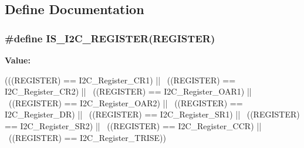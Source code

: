 \subsection{Define Documentation}
\hypertarget{group__I2C__registers_ga37206b258f7930065c308ec7d35f243e}{
\subsubsection[{IS\_\-I2C\_\-REGISTER}]{\setlength{\rightskip}{0pt plus 5cm}\#define IS\_\-I2C\_\-REGISTER(REGISTER)}}
\label{group__I2C__registers_ga37206b258f7930065c308ec7d35f243e}
{\bfseries Value:}
\begin{DoxyCode}
(((REGISTER) == I2C_Register_CR1) || \
                                   ((REGISTER) == I2C_Register_CR2) || \
                                   ((REGISTER) == I2C_Register_OAR1) || \
                                   ((REGISTER) == I2C_Register_OAR2) || \
                                   ((REGISTER) == I2C_Register_DR) || \
                                   ((REGISTER) == I2C_Register_SR1) || \
                                   ((REGISTER) == I2C_Register_SR2) || \
                                   ((REGISTER) == I2C_Register_CCR) || \
                                   ((REGISTER) == I2C_Register_TRISE))
\end{DoxyCode}
